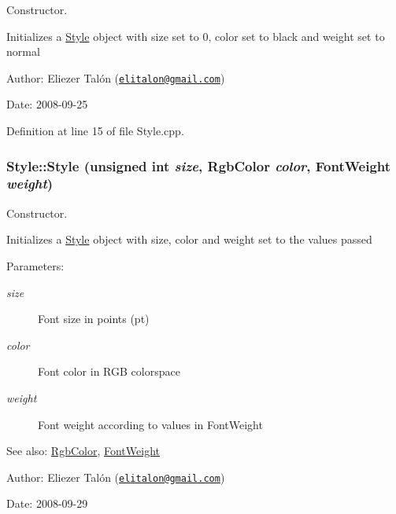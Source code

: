 Constructor. 

Initializes a \hyperlink{class_style}{Style} object with size set to 0, color set to black and weight set to normal

\begin{Desc}
\item[Author:]Eliezer Talón (\href{mailto:elitalon@gmail.com}{\tt elitalon@gmail.com}) \end{Desc}
\begin{Desc}
\item[Date:]2008-09-25 \end{Desc}


Definition at line 15 of file Style.cpp.\hypertarget{class_style_69801b8ce2b1520ef24e1a84d04609e5}{
\subsubsection[Style]{\setlength{\rightskip}{0pt plus 5cm}Style::Style (unsigned int {\em size}, \/  {\bf RgbColor} {\em color}, \/  {\bf FontWeight} {\em weight})}}
\label{class_style_69801b8ce2b1520ef24e1a84d04609e5}


Constructor. 

Initializes a \hyperlink{class_style}{Style} object with size, color and weight set to the values passed

\begin{Desc}
\item[Parameters:]
\begin{description}
\item[{\em size}]Font size in points (pt) \item[{\em color}]Font color in RGB colorspace \item[{\em weight}]Font weight according to values in FontWeight\end{description}
\end{Desc}
\begin{Desc}
\item[See also:]\hyperlink{struct_rgb_color}{RgbColor}, \hyperlink{_font_weight_8h_ecff23ba4a68486421bcea57e095fe66}{FontWeight}\end{Desc}
\begin{Desc}
\item[Author:]Eliezer Talón (\href{mailto:elitalon@gmail.com}{\tt elitalon@gmail.com}) \end{Desc}
\begin{Desc}
\item[Date:]2008-09-29 \end{Desc}


